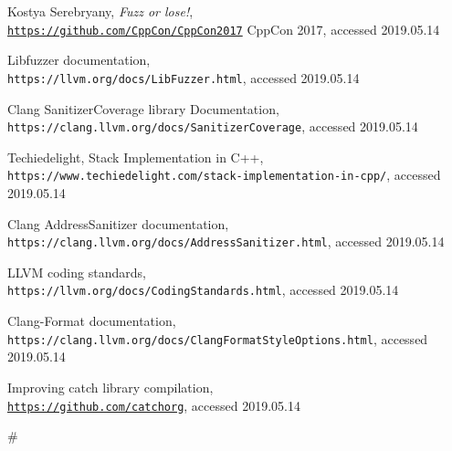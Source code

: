 \documentclass{elteikthesis}[2018/06/06]
\begin{document}
\begin{thebibliography}{9}
\setcounter{page}{42}
Kostya Serebryany, \textit{Fuzz or lose!}, \\\texttt{\href{https://github.com/CppCon/CppCon2017/blob/master/Demos/Fuzz\%20Or\%20Lose/Fuzz\%20Or\%20Lose\%20-\%20Kostya\%20Serebryany\%20-\%20CppCon\%202017.pdf}{https://github.com/CppCon/CppCon2017}}  CppCon 2017, accessed 2019.05.14

Libfuzzer documentation, 
\\\texttt{https://llvm.org/docs/LibFuzzer.html}, accessed 2019.05.14

Clang SanitizerCoverage library Documentation, \\\texttt{https://clang.llvm.org/docs/SanitizerCoverage}, accessed 2019.05.14

Techiedelight, Stack Implementation in C++, \\\texttt{https://www.techiedelight.com/stack-implementation-in-cpp/}, accessed 2019.05.14

Clang AddressSanitizer documentation, \\\texttt{https://clang.llvm.org/docs/AddressSanitizer.html}, accessed 2019.05.14

LLVM coding standards, 
\\\texttt{https://llvm.org/docs/CodingStandards.html}, accessed 2019.05.14

Clang-Format documentation, \\\texttt{https://clang.llvm.org/docs/ClangFormatStyleOptions.html}, accessed 2019.05.14

Improving catch library compilation, \\\texttt{\href{https://github.com/catchorg/Catch2/blob/master/docs/slow-compiles.md}{https://github.com/catchorg}}, accessed 2019.05.14


# \chapter*{}
\end{thebibliography}
\end{document}
